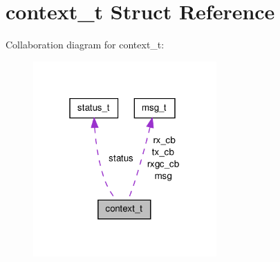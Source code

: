 \hypertarget{structcontext__t}{\section{context\-\_\-t \-Struct \-Reference}
\label{structcontext__t}
}


\-Collaboration diagram for context\-\_\-t\-:
\nopagebreak
\begin{figure}[H]
\begin{center}
\leavevmode
\includegraphics[width=199pt]{structcontext__t__coll__graph}
\end{center}
\end{figure}
